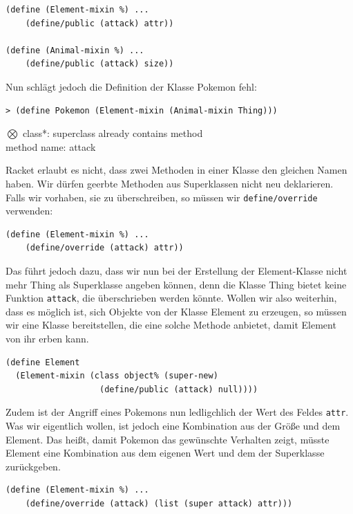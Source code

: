 \begin{lstlisting}
(define (Element-mixin %) ...
    (define/public (attack) attr))
 
(define (Animal-mixin %) ...
    (define/public (attack) size))
\end{lstlisting}

Nun schlägt jedoch die Definition der Klasse Pokemon fehl:

\begin{lstlisting}
> (define Pokemon (Element-mixin (Animal-mixin Thing)))
\end{lstlisting}
{\rerror $\bigotimes$ class*: superclass already contains method\\
method name: attack}

Racket erlaubt es nicht, dass zwei Methoden in einer Klasse den gleichen Namen haben. Wir dürfen geerbte Methoden aus Superklassen nicht neu deklarieren. Falls wir vorhaben, sie zu überschreiben, so müssen wir \texttt{define/override} verwenden:

\begin{lstlisting}
(define (Element-mixin %) ...
    (define/override (attack) attr))
\end{lstlisting}

Das führt jedoch dazu, dass wir nun bei der Erstellung der Element-Klasse nicht mehr Thing als Superklasse angeben können, denn die Klasse Thing bietet keine Funktion \texttt{attack}, die überschrieben werden könnte. Wollen wir also weiterhin, dass es möglich ist, sich Objekte von der Klasse Element zu erzeugen, so müssen wir eine Klasse bereitstellen, die eine solche Methode anbietet, damit Element von ihr erben kann.

\begin{lstlisting}
(define Element 
  (Element-mixin (class object% (super-new)
                   (define/public (attack) null))))
\end{lstlisting}

Zudem ist der Angriff eines Pokemons nun ledligchlich der Wert des Feldes \texttt{attr}. 
% 
Was wir eigentlich wollen, ist jedoch eine Kombination aus der Größe und dem Element. Das heißt, damit Pokemon das gewünschte Verhalten zeigt, müsste Element eine Kombination aus dem eigenen Wert und dem der Superklasse zurückgeben.

\begin{lstlisting}
(define (Element-mixin %) ...
    (define/override (attack) (list (super attack) attr)))
\end{lstlisting}

